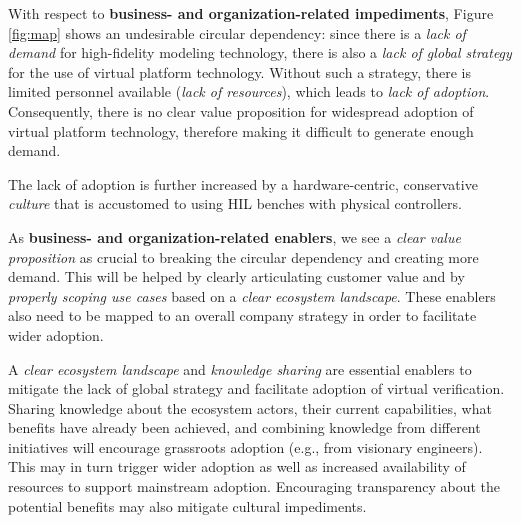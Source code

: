 


With respect to \textbf{business- and organization-related impediments}, Figure \ref{fig:map} shows an undesirable circular dependency:
since there is a \emph{lack of demand} for high-fidelity modeling technology,
there is also a \emph{lack of global strategy} for the use of virtual platform technology.
Without such a strategy, there is limited personnel available (\emph{lack of resources}),
which leads to \emph{lack of adoption}.
Consequently, there is no clear value proposition for widespread adoption of virtual platform technology, therefore making it difficult to generate enough demand.

The lack of adoption is further increased by a hardware-centric, conservative \emph{culture} that is accustomed to using HIL benches with physical controllers.

As \textbf{business- and organization-related enablers}, %
we see a \emph{clear value proposition} as crucial to breaking the circular dependency and creating more demand.
This will be helped by clearly articulating customer value and by \emph{properly scoping use cases} based on a \emph{clear ecosystem landscape}.
These enablers also need to be mapped to an overall company strategy in order to facilitate wider adoption. 

A \emph{clear ecosystem landscape} and \emph{knowledge sharing} are essential enablers to mitigate the lack of global strategy and facilitate adoption of virtual verification.
Sharing knowledge about the ecosystem actors, their current capabilities, what benefits have already been achieved, and combining knowledge from different initiatives will encourage grassroots adoption (e.g., from visionary engineers). 
This may in turn trigger wider adoption
as well as increased availability of resources to support mainstream adoption. 
Encouraging transparency about the potential benefits may also mitigate cultural impediments.

